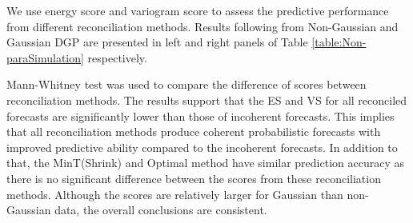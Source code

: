 \documentclass[12pt]{article}
\theoremstyle{definition}
\begin{document}




We use energy score and variogram score to assess the predictive performance from different reconciliation methods. Results following from Non-Gaussian and Gaussian DGP are presented in left and right panels of Table \ref{table:Non-paraSimulation} respectively.

Mann-Whitney test was used to compare the difference of scores between reconciliation methods. The results support that the ES and VS for all reconciled forecasts are significantly lower than those of incoherent forecasts. This implies that all reconciliation methods produce coherent probabilistic forecasts with improved predictive ability compared to the incoherent forecasts. In addition to that, the MinT(Shrink) and Optimal method have similar prediction accuracy as there is no significant difference between the scores from these reconciliation methods. Although the scores are relatively larger for Gaussian than non-Gaussian data, the overall conclusions are consistent.
\end{document}
